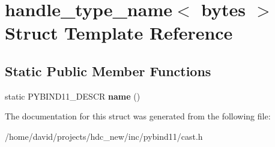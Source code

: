 \hypertarget{structhandle__type__name_3_01bytes_01_4}{}\section{handle\+\_\+type\+\_\+name$<$ bytes $>$ Struct Template Reference}
\label{structhandle__type__name_3_01bytes_01_4}
\subsection*{Static Public Member Functions}
\begin{DoxyCompactItemize}
\item 
static P\+Y\+B\+I\+N\+D11\+\_\+\+D\+E\+S\+CR {\bfseries name} ()\hypertarget{structhandle__type__name_3_01bytes_01_4_a7d2aac7e7d2cb5219da00eb23ed4a7a3}{}\label{structhandle__type__name_3_01bytes_01_4_a7d2aac7e7d2cb5219da00eb23ed4a7a3}

\end{DoxyCompactItemize}


The documentation for this struct was generated from the following file\+:\begin{DoxyCompactItemize}
\item 
/home/david/projects/hdc\+\_\+new/inc/pybind11/cast.\+h\end{DoxyCompactItemize}
